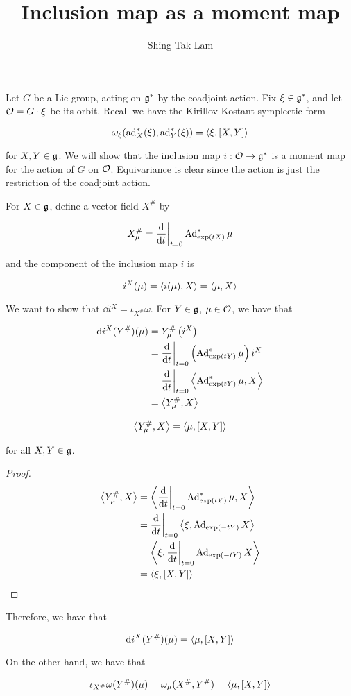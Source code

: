 \documentclass{article}
\title{Inclusion map as a moment map}
\author{Shing Tak Lam}
\begin{document}
\maketitle

Let \(G\) be a Lie group, acting on \(\mathfrak{g}^*\) by the coadjoint action. Fix \(\xi \in \mathfrak{g}^*\), and let \(\mathcal{O} = G \cdot \xi\) be its orbit. Recall we have the Kirillov-Kostant symplectic form

\[\omega_\xi(\operatorname{ad}_X^*(\xi), \operatorname{ad}_Y^*(\xi)) = \left\langle \xi,[X, Y] \right\rangle\]

for \(X, Y \in \mathfrak{g}\). We will show that the inclusion map \(i : \mathcal{O} \to \mathfrak{g}^*\) is a moment map for the action of \(G\) on \(\mathcal{O}\). Equivariance is clear since the action is just the restriction of the coadjoint action. 

For \(X \in \mathfrak{g}\), define a vector field \(X^\#\) by

\[X^\#_\mu = \dv{t}\bigg\vert_{t=0}\operatorname{Ad}_{\exp(tX)}^*\mu\]

and the component of the inclusion map \(i\) is

\[i^X(\mu) = \left\langle i(\mu), X \right\rangle = \left\langle \mu, X \right\rangle\]

We want to show that \(\dd i^X = \iota_{X^\#}\omega\). For \(Y \in \mathfrak{g}\), \(\mu \in \mathcal{O}\), we have that

\begin{align*}
    \dd i^X(Y^\#)(\mu) &= Y_\mu^\#\left(i^X\right) \\
    &= \dv{t}\bigg\vert_{t=0}\left(\operatorname{Ad}_{\exp(tY)}^*\mu\right)i^X \\
    &= \dv{t}\bigg\vert_{t=0}\left\langle \operatorname{Ad}_{\exp(tY)}^*\mu, X \right\rangle \\
    &= \left\langle Y_\mu^\#, X \right\rangle
\end{align*}

\begin{lemma*}
    \[\left\langle Y_\mu^\#, X \right\rangle = \left\langle \mu, [X, Y] \right\rangle\]

    for all \(X, Y \in \mathfrak{g}\).
\end{lemma*}

\begin{proof}
    \begin{align*}
        \left\langle Y_\mu^\#, X \right\rangle &= \left\langle \dv{t}\bigg\vert_{t=0}\operatorname{Ad}_{\exp(tY)}^*\mu, X \right\rangle \\
        &= \dv{t}\bigg\vert_{t=0}\left\langle \xi, \operatorname{Ad}_{\exp(-tY)}X \right\rangle \\
        &= \left\langle \xi, \dv{t}\bigg\vert_{t=0}\operatorname{Ad}_{\exp(-tY)}X \right\rangle \\
        &= \left\langle \xi, [X, Y] \right\rangle
    \end{align*}
\end{proof}

Therefore, we have that

\[\dd i^X(Y^\#)(\mu) = \left\langle \mu, [X, Y] \right\rangle\]

On the other hand, we have that

\[\iota_{X^\#}\omega(Y^\#)(\mu) = \omega_\mu(X^\#, Y^\#) = \left\langle \mu, [X, Y] \right\rangle\]
\end{document}

